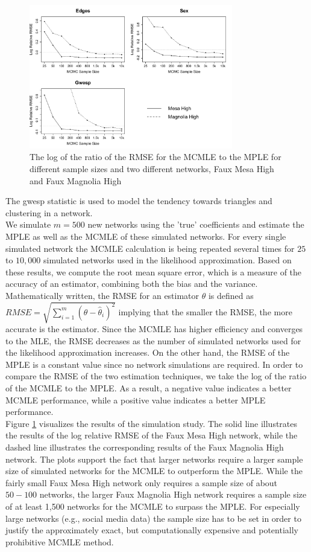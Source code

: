 \documentclass{llncs}
\begin{document}
\begin{figure}[!t]
\centering
\includegraphics[width=3.5in]{RMSE_10k}
\caption{The log of the ratio of the RMSE for the MCMLE to the MPLE for different sample sizes and two different networks, Faux Mesa High and Faux Magnolia High}
\label{rmse}
\end{figure}
The gwesp statistic is used to model the tendency towards triangles and clustering in a network.\\
\indent We simulate $m=500$ new networks using the 'true' coefficients and estimate the MPLE as well as the MCMLE of these simulated networks. For every single simulated network the MCMLE calculation is being repeated several times for $25$ to $10,000$ simulated networks used in the likelihood approximation.
Based on these results, we compute the root mean square error, which is a measure of the accuracy of an estimator, combining both the bias and the variance. Mathematically written, the RMSE for an estimator $\hat{\theta}$ is defined as 
$RMSE = \sqrt{\sum_{i=1}^{m}(\theta - \hat{\theta}_i)^2}$
implying that the smaller the RMSE, the more accurate is the estimator. Since the MCMLE has higher efficiency and converges to the MLE, the RMSE decreases as the number of simulated networks used for the likelihood approximation increases. On the other hand, the RMSE of the MPLE is a constant value since no network simulations are required. In order to compare the RMSE of the two estimation techniques, we take the log of the ratio of the MCMLE to the MPLE. As a result, a negative value indicates a better MCMLE performance, while a positive value indicates a better MPLE performance.\\
\indent Figure \ref{rmse} visualizes the results of the simulation study. The solid line illustrates the results of the log relative RMSE of the Faux Mesa High network, while the dashed line illustrates the corresponding results of the Faux Magnolia High network. 
The plots support the fact that larger networks require a larger sample size of simulated networks for the MCMLE to outperform the MPLE. While the fairly small Faux Mesa High network only requires a sample size of about $50-100$ networks, the larger Faux Magnolia High network requires a sample size of at least 1,500 networks for the MCMLE to surpass the MPLE.  For especially large networks (e.g., social media data) the sample size has to be set in order to justify the approximately exact, but computationally expensive and potentially prohibitive MCMLE method.
\end{document}
